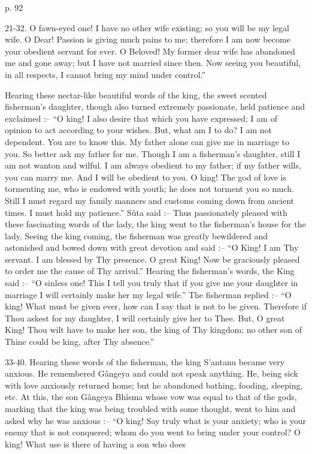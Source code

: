 p. 92

 

21-32. O fawn-eyed one! I have no other wife existing; so you will be my legal wife. O Dear! Passion is giving much pains to me; therefore I am now become your obedient servant for ever. O Beloved! My former dear wife has abandoned me and gone away; but I have not married since then. Now seeing you beautiful, in all respects, I cannot bring my mind under control.”

 

Hearing these nectar-like beautiful words of the king, the sweet scented fisherman's daughter, though also turned extremely passionate, held patience and exclaimed :-- “O king! I also desire that which you have expressed; I am of opinion to act according to your wishes. But, what am I to do? I am not dependent. You are to know this. My father alone can give me in marriage to you. So better ask my father for me. Though I am a fisherman's daughter, still I am not wanton and wilful. I am always obedient to my father; if my father wills, you can marry me. And I will be obedient to you. O king! The god of love is tormenting me, who is endowed with youth; he does not torment you so much. Still I must regard my family manners and customs coming down from ancient times. I must hold my patience.” Sûta said :-- Thus passionately pleased with these fascinating words of the lady, the king went to the fisherman's house for the lady. Seeing the king coming, the fisherman was greatly bewildered and astonished and bowed down with great devotion and said :-- “O King! I am Thy servant. I am blessed by Thy presence. O great King! Now be graciously pleased to order me the cause of Thy arrival.” Hearing the fisherman's words, the King said :-- “O sinless one! This I tell you truly that if you give me your daughter in marriage I will certainly make her my legal wife.” The fisherman replied :-- “O king! What must be given ever, how can I say that is not to be given. Therefore if Thou askest for my daughter, I will certainly give her to Thee. But, O great King! Thou wilt have to make her son, the king of Thy kingdom; no other son of Thine could be king, after Thy absence.”

 

33-40. Hearing these words of the fisherman, the king S’antanu became very anxious. He remembered Gângeya and could not speak anything. He, being sick with love anxiously returned home; but he abandoned bathing, fooding, sleeping, etc. At this, the son Gângeya Bhîsma whose vow was equal to that of the gods, marking that the king was being troubled with some thought, went to him and asked why he was anxious :-- “O king! Say truly what is your anxiety; who is your enemy that is not conquered; whom do you went to bring under your control? O king! What use is there of having a son who does

